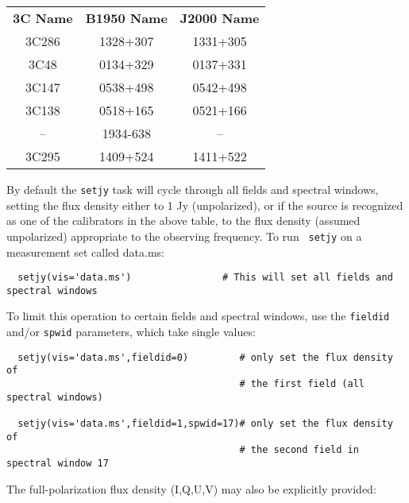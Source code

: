 \vspace{5mm}
\begin{table}[h!]
\caption[Recognized Flux Density Calibrators.]
        {\label{table:fluxcal-table}}
\begin{center}
\begin{tabular}{|ccc|} \hline
{\bf 3C Name}  & {\bf B1950 Name}& {\bf J2000 Name} \\
  3C286        &  1328+307       &  1331+305        \\
  3C48         &  0134+329       &  0137+331        \\
  3C147        &  0538+498       &  0542+498        \\
  3C138        &  0518+165       &  0521+166        \\
  --           &  1934-638       &    --            \\
  3C295        &  1409+524       &  1411+522        \\
\hline
\end{tabular}
\end{center}
\end{table}


By default the {\tt setjy} task will cycle through all fields and
spectral windows, setting the flux density either to 1 Jy
(unpolarized), or if the source is recognized as one of the
calibrators in the above table, to the flux density (assumed
unpolarized) appropriate to the observing frequency.  To run {\tt
setjy} on a measurement set called data.ms:

\small
\begin{verbatim}
  setjy(vis='data.ms')                # This will set all fields and spectral windows
\end{verbatim}
\normalsize

To limit this operation to certain fields and spectral windows, use
the {\tt fieldid} and/or {\tt spwid} parameters, which take single
values:

\small
\begin{verbatim}
  setjy(vis='data.ms',fieldid=0)         # only set the flux density of
                                         # the first field (all spectral windows)

  setjy(vis='data.ms',fieldid=1,spwid=17)# only set the flux density of
                                         # the second field in spectral window 17
\end{verbatim}
\normalsize

The full-polarization flux density (I,Q,U,V) may also be explicitly provided:

